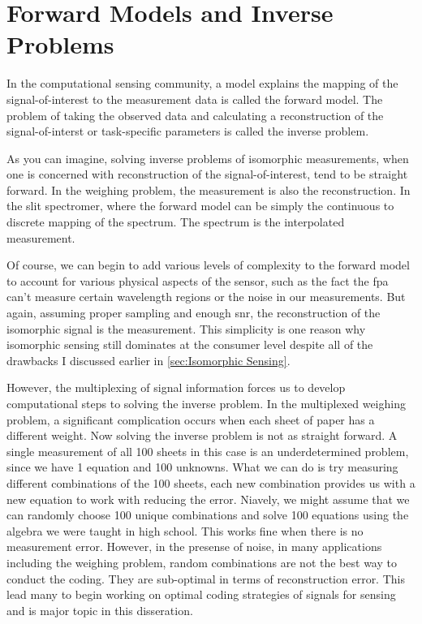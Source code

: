 \section{Forward Models and Inverse Problems}

In the computational sensing community, a model explains the mapping of the signal-of-interest to the measurement data is called the \gls{forward model}. The problem of taking the observed data and calculating a reconstruction of the signal-of-interst or task-specific parameters is called the \gls{inverse problem}.

As you can imagine, solving inverse problems of isomorphic measurements, when one is concerned with reconstruction of the signal-of-interest, tend to be straight forward. In the weighing problem, the measurement is also the reconstruction. In the slit spectromer, where the forward model can be simply the continuous to discrete mapping of the spectrum. The spectrum is the interpolated measurement. 

Of course, we can begin to add various levels of complexity to the forward model to account for various physical aspects of the sensor, such as the fact the \gls{fpa} can't measure certain wavelength regions or the noise in our measurements. But again, assuming proper sampling and enough \gls{snr}, the reconstruction of the isomorphic signal is the measurement. This simplicity is one reason why isomorphic sensing still dominates at the consumer level despite all of the drawbacks I discussed earlier in \autoref{sec:Isomorphic Sensing}. 

However, the multiplexing of signal information forces us to develop computational steps to solving the inverse problem. In the multiplexed weighing problem, a significant complication occurs when each sheet of paper has a different weight. Now solving the inverse problem is not as straight forward. A single measurement of all 100 sheets in this case is an underdetermined problem, since we have 1 equation and 100 unknowns. What we can do is try measuring different combinations of the 100 sheets, each new combination provides us with a new equation to work with reducing the error. Niavely, we might assume that we can randomly choose 100 unique combinations and solve 100 equations using the algebra we were taught in high school. This works fine when there is no measurement error. However, in the presense of noise, in many applications including the weighing problem, random combinations are not the best way to conduct the coding. They are sub-optimal in terms of reconstruction error. This lead many to begin working on optimal coding strategies of signals for sensing and is major topic in this disseration.

